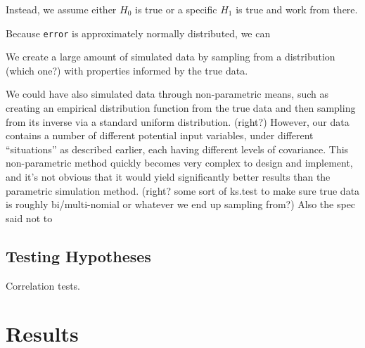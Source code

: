 \documentclass[11pt, oneside]{article}
\newcommand \Rcode[1]{{\texttt{\colorbox{codegray}{#1}}}}
\begin{document}
Instead, we assume either $H_0$ is true or a specific $H_1$ is true and work from there. 

Because \Rcode{error} is approximately normally distributed, we can 

We create a large amount of simulated data by sampling from a distribution (which one?) with properties informed by the true data. 

We could have also simulated data through non-parametric means, such as creating an empirical distribution function from the true data and then sampling from its inverse via a standard uniform distribution. (right?) However, our data contains a number of different potential input variables, under different ``situations'' as described earlier, each having different levels of covariance. This non-parametric method quickly becomes very complex to design and implement, and it's not obvious that it would yield significantly better results than the parametric simulation method. (right? some sort of ks.test to make sure true data is roughly bi/multi-nomial or whatever we end up sampling from?) Also the spec said not to

\subsection{Testing Hypotheses}
\label{subsec:testing}

Correlation tests. 




\section{Results}
\end{document}
